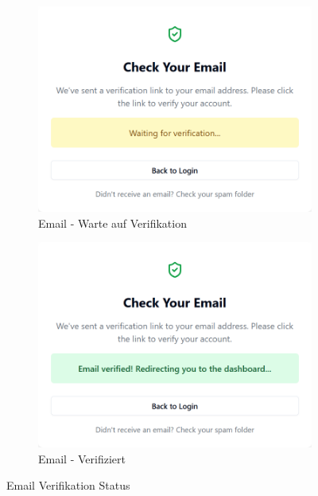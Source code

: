 \begin{inhalt}
\begin{figure}[H] 
  \centering
  \begin{subfigure}[b]{0.48\textwidth}
    \centering
    \includegraphics[width=1\textwidth]{files/Thomas/pics/Website/emailconfirmed/checkyouremails_waiting_verification.png}
    \caption{Email - Warte auf Verifikation}
    \label{fig:email_waiting_verification}
  \end{subfigure}
  \hfill
  \begin{subfigure}[b]{0.48\textwidth}
    \centering
    \includegraphics[width=1\textwidth]{files/Thomas/pics/Website/emailconfirmed/checkyouremails_verified.png}
    \caption{Email - Verifiziert}
    \label{fig:email_verified}
  \end{subfigure}
  \caption{Email Verifikation Status}
  \label{fig:email_verification_states}
\end{figure}



\end{inhalt}
